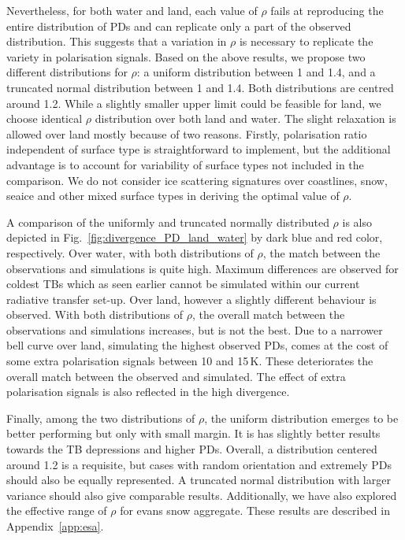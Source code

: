 \documentclass[amt, manuscript]{copernicus}
\begin{document}
Nevertheless, for both water and land, each value of $\rho$ fails at reproducing the entire distribution of PDs and can replicate only a part of the observed distribution. This suggests that a variation in $\rho$ is necessary to replicate the variety in polarisation signals. Based on the above results, we propose two different distributions for $\rho$: a uniform distribution between 1 and 1.4, and a truncated normal distribution between 1 and 1.4. Both distributions are centred around 1.2. While a slightly smaller upper limit could be feasible for land, we choose identical $\rho$ distribution over both land and water. The slight relaxation is allowed over land mostly because of two reasons. Firstly, polarisation ratio independent of surface type is straightforward to implement, but the additional advantage is to account for variability of surface types not included in the comparison. We do not consider ice scattering signatures over coastlines, snow, seaice and other mixed surface types in deriving the optimal value of $\rho$. 

A comparison of the uniformly and truncated normally distributed $\rho$ is also depicted in Fig.~\ref{fig:divergence_PD_land_water} by dark blue and red color, respectively. Over water, with both distributions of $\rho$, the match between the observations and simulations is quite high. Maximum differences are observed for coldest TBs which as seen earlier cannot be simulated within our current radiative transfer set-up. Over land, however a slightly different behaviour is observed. With both distributions of $\rho$, the overall match between the observations and simulations increases, but is not the best. Due to a narrower bell curve over land, simulating the highest observed PDs, comes at the cost of some extra polarisation signals between 10 and 15\,K. These deteriorates the overall match between the observed and simulated. The effect of extra polarisation signals is also reflected in the high divergence. 

Finally, among the two distributions of $\rho$, the uniform distribution emerges to be better performing but only with small margin. It is has slightly better results towards the TB depressions and higher PDs. Overall, a distribution centered around 1.2 is a requisite, but cases with random orientation and extremely PDs should also be equally represented. A truncated normal distribution with larger variance should also give comparable results. Additionally, we have also explored the effective range of $\rho$ for evans snow aggregate. These results are described in Appendix~\ref{app:esa}. 
\end{document}
